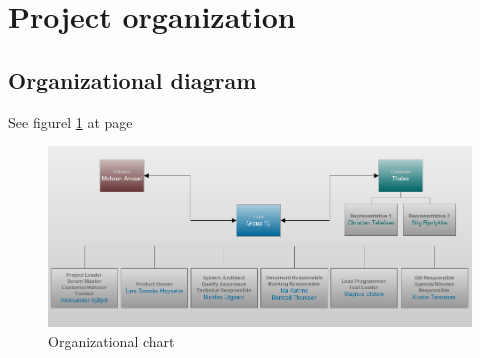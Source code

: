 

\section{Project organization}

\subsection{Organizational diagram}
See figurel \ref{fig:organizationalchart} at page \pageref{fig:organizationalchart}
\begin{figure}
\begin{center}
\includegraphics[width=\textwidth]{Organizational_Chart}
\caption{Organizational chart} \label{fig:organizationalchart}
\end{center}
\end{figure}

